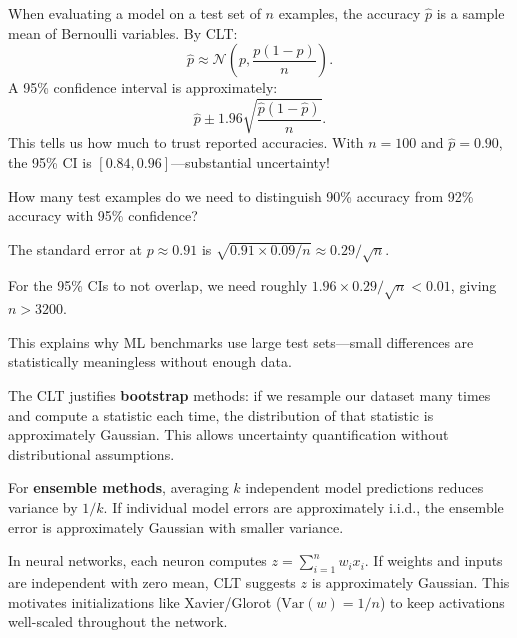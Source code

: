 \begin{remark}
    When evaluating a model on a test set of $n$ examples, the accuracy $\hat{p}$ is a sample mean of Bernoulli variables. By CLT:
    \[
        \hat{p} \approx \mathcal{N}\left(p, \frac{p(1-p)}{n}\right).
    \]
    A 95\% confidence interval is approximately:
    \[
        \hat{p} \pm 1.96 \sqrt{\frac{\hat{p}(1-\hat{p})}{n}}.
    \]
    This tells us how much to trust reported accuracies. With $n=100$ and $\hat{p}=0.90$, the 95\% CI is $[0.84, 0.96]$---substantial uncertainty!
\end{remark}

\begin{example}
    How many test examples do we need to distinguish 90\% accuracy from 92\% accuracy with 95\% confidence?

    The standard error at $p \approx 0.91$ is $\sqrt{0.91 \times 0.09 / n} \approx 0.29/\sqrt{n}$.

    For the 95\% CIs to not overlap, we need roughly $1.96 \times 0.29/\sqrt{n} < 0.01$, giving $n > 3200$.

    This explains why ML benchmarks use large test sets---small differences are statistically meaningless without enough data.
\end{example}

\begin{remark}
    The CLT justifies \textbf{bootstrap} methods: if we resample our dataset many times and compute a statistic each time, the distribution of that statistic is approximately Gaussian. This allows uncertainty quantification without distributional assumptions.

    For \textbf{ensemble methods}, averaging $k$ independent model predictions reduces variance by $1/k$. If individual model errors are approximately i.i.d., the ensemble error is approximately Gaussian with smaller variance.
\end{remark}

\begin{remark}
    In neural networks, each neuron computes $z = \sum_{i=1}^n w_i x_i$. If weights and inputs are independent with zero mean, CLT suggests $z$ is approximately Gaussian. This motivates initializations like Xavier/Glorot ($\mathrm{Var}(w) = 1/n$) to keep activations well-scaled throughout the network.
\end{remark}

